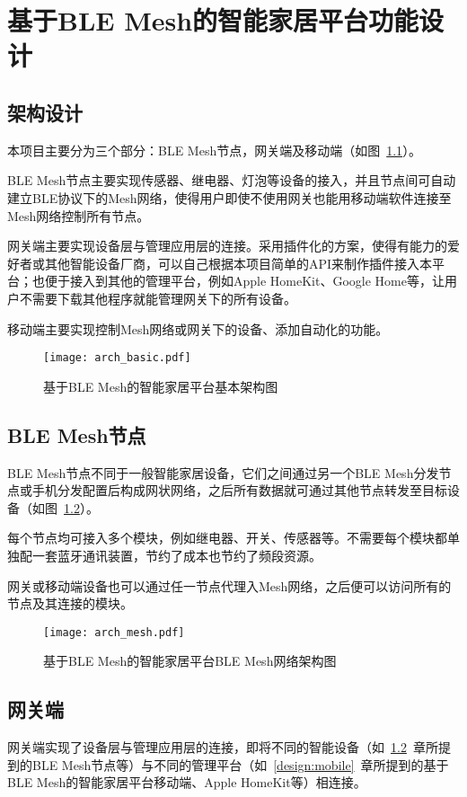 \chapter{基于BLE Mesh的智能家居平台功能设计}

\section{架构设计}
本项目主要分为三个部分：BLE Mesh节点，网关端及移动端（如图~\ref{fig:arch_basic}）。

BLE Mesh节点主要实现传感器、继电器、灯泡等设备的接入，并且节点间可自动建立BLE协议下的Mesh网络，使得用户即使不使用网关也能用移动端软件连接至Mesh网络控制所有节点。

网关端主要实现设备层与管理应用层的连接。采用插件化的方案，使得有能力的爱好者或其他智能设备厂商，可以自己根据本项目简单的API来制作插件接入本平台；也便于接入到其他的管理平台，例如Apple HomeKit、Google Home等，让用户不需要下载其他程序就能管理网关下的所有设备。

移动端主要实现控制Mesh网络或网关下的设备、添加自动化的功能。
\begin{figure}[H]
    \centering
    \texttt{[image: arch\_basic.pdf]}
    \caption{基于BLE Mesh的智能家居平台基本架构图}
    \label{fig:arch_basic}
\end{figure}

\section{BLE Mesh节点}
\label{design:blemeshnode}
BLE Mesh节点不同于一般智能家居设备，它们之间通过另一个BLE Mesh分发节点或手机分发配置后构成网状网络，之后所有数据就可通过其他节点转发至目标设备（如图~\ref{fig:arch_mesh}）。

每个节点均可接入多个模块，例如继电器、开关、传感器等。不需要每个模块都单独配一套蓝牙通讯装置，节约了成本也节约了频段资源。

网关或移动端设备也可以通过任一节点代理入Mesh网络，之后便可以访问所有的节点及其连接的模块。
\begin{figure}[H]
    \centering
    \texttt{[image: arch\_mesh.pdf]}
    \caption{基于BLE Mesh的智能家居平台BLE Mesh网络架构图}
    \label{fig:arch_mesh}
\end{figure}

\section{网关端}
网关端实现了设备层与管理应用层的连接，即将不同的智能设备（如~\ref{design:blemeshnode}~章所提到的BLE Mesh节点等）与不同的管理平台（如~\ref{design:mobile}~章所提到的基于BLE Mesh的智能家居平台移动端、Apple HomeKit等）相连接。

